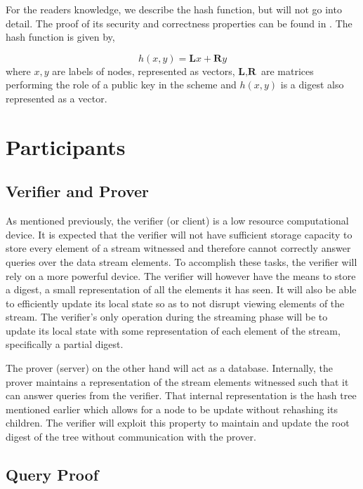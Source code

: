 \documentclass[11pt, letterpaper, oneside]{article}
\begin{document}
	For the readers knowledge, we describe the hash function, but will not go into detail.  The proof of its security and correctness properties can be found in \cite{sads}.
	The hash function is given by,

	\begin{equation}
		h(x,y)= \textbf{L} x + \textbf{R}y
	\end{equation}
	where $x, y$ are labels of nodes, represented as vectors, $\textbf{L}, \textbf{R}$ are matrices performing the role of a public key in the scheme and $h(x,y)$ is a digest also represented as a vector.

\section{ Participants }
\label{sec:parts}

	\subsection{ Verifier and Prover }

		As mentioned previously, the verifier (or client) is a low resource computational device.
		It is expected that the verifier will not have sufficient storage capacity to store every element of a stream witnessed and therefore cannot correctly answer queries over the data stream elements.
		To accomplish these tasks, the verifier will rely on a more powerful device.
		The verifier will however have the means to store a digest, a small representation of all the elements it has seen.
		It will also be able to efficiently update its local state so as to not disrupt viewing elements of the stream.
		The verifier's only operation during the streaming phase will be to update its local state with some representation of each element of the stream, specifically a partial digest.

		The prover (server) on the other hand will act as a database.
		Internally, the prover maintains a representation of the stream elements witnessed such that it can answer queries from the verifier.
		That internal representation is the hash tree mentioned earlier which allows for a node to be update without rehashing its children.
		The verifier will exploit this property to maintain and update the root digest of the tree without communication with the prover.

		\subsection{ Query Proof }
\end{document}
